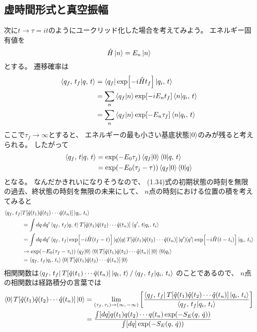 \documentclass[../../master.tex]{subfiles}
\begin{document}
\subsection*{虚時間形式と真空振幅}
次に\(t\rightarrow\tau=it\)のようにユークリッド化した場合を考えてみよう。
エネルギー固有値を
\begin{equation}
    \hat{H}\ket{n}=E_n\ket{n}
\end{equation}
とする。
遷移確率は
\begin{align}
    \braket{q_f,\,t_f}{q,\,t}
    &= \bra{q_f}\exp[-i\hat{H}t_f]\ket{q_i,\,t} \notag\\
    &= \sum_{n} \braket{q_f}{n}\exp[-iE_n t_f]\braket{n}{q_i,\,t}\\
    &= \sum_{n} \braket{q_f}{n}\exp[-E_n \tau_f]\braket{n}{q_i,\,t} \notag
\end{align}
ここで\(\tau_f\rightarrow\infty\)とすると、
エネルギーの最も小さい基底状態\(\ket{0}\)のみが残ると考えられる。
したがって
\begin{align}
    \braket{q_f,\,t}{q,\,t}
    &= \exp(-E_0\tau_j)\braket{q_f}{0}\braket{0}{q,\,t}\\
    &= \exp(-E_0(\tau_j-\tau))\braket{q_f}{0}\braket{0}{q} \notag
\end{align}
となる。
なんだかきれいになりそうなので、
(1.34)式の初期状態の時刻を無限の過去、終状態の時刻を無限の未来にして、
\(n\)点の時刻における位置の積を考えてみると
\begin{align}
    \bra{q_f,\,t_f} &T[\hat{q}(t_1)\hat{q}(t_2)\cdots\hat{q}(t_n)] \ket{q_i,\,t_i} \notag\\
    &=\int dq\,dq' \braket{q_f,\,t_f}{q,\,t} T[\hat{q}(t_1)\hat{q}(t_2)\cdots\hat{q}(t_n)] \braket{q',\,t}{q_i,\,t_i} \notag\\
    &=\int dq\,dq' \bra{q_f,\,t_f}\exp[-i\hat{H}(t_f-t)]\ketbra{q} T[\hat{q}(t_1)\hat{q}(t_2)\cdots\hat{q}(t_n)] \ketbra{q'}\exp[-i\hat{H}(t-t_i)]\ket{q_i,\,t_i} \notag\\
    &\rightarrow\exp(-E_0(\tau_f-\tau_i))\braket{q_f}{0} \bra{0}T[\hat{q}(t_1)\hat{q}(t_2)\cdots\hat{q}(t_n)] \ket{0}\braket{0}{q_i}\\
    &=\braket{q_f,\,t_f}{q_i,\,t_i} \bra{0}T[\hat{q}(t_1)\hat{q}(t_2)\cdots\hat{q}(t_n)] \ket{0} \notag
\end{align}
相関関数は\(\bra{q_f,\,t_f}T[\hat{q}(t_1)\cdots\hat{q}(t_n)]\ket{q_t,\,t}/\braket{q_f,\,t_f}{q_i,\,t_i}\)
のことであるので、
\(n\)点の相関数は経路積分の言葉では
\begin{align}
    \bra{0}T[\hat{q}(t_1)\hat{q}(t_2)\cdots\hat{q}(t_n)] \ket{0}
    &= \lim_{(\tau_f,\,\tau_i)\rightarrow(\infty,\,-\infty)}\qty[
    \frac{\bra{q_f,\,t_f} T[\hat{q}(t_1)\hat{q}(t_2)\cdots\hat{q}(t_n)] \ket{q_i,\,t_i}}{\braket{q_f,\,t_f}{q_i,\,t_i}}] \notag\\
    &=\dfrac{\int [dq] q(t_1)q(t_2)\cdots q(t_n)\exp(-S_E(q,\,\dot{q}))}{\int [dq]\exp(-S_E(q,\,\dot{q}))}
\end{align}
\end{document}
